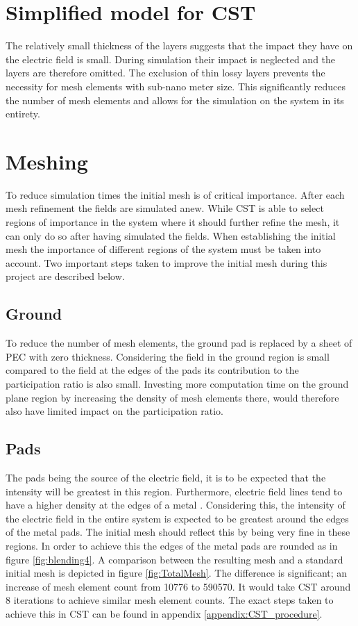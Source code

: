 \section{Simplified model for CST}
The relatively small thickness of the layers suggests that the impact they have on the electric field is small. During simulation their impact is neglected and the layers are therefore omitted. The exclusion of thin lossy layers prevents the necessity for mesh elements with sub-nano meter size. This significantly reduces the number of mesh elements and allows for the simulation on the system in its entirety.

\section{Meshing}
To reduce simulation times the initial mesh is of critical importance. After each mesh refinement the fields are simulated anew. While CST is able to select regions of importance in the system where it should further refine the mesh, it can only do so after having simulated the fields. When establishing the initial mesh the importance of different regions of the system must be taken into account. Two  important steps taken to improve the initial mesh during this project are described below.   


\subsection{Ground}
To reduce the number of mesh elements, the ground pad is replaced by a sheet of PEC with zero thickness. Considering the field in the ground region is small compared to the field at the edges of the pads its contribution to the participation ratio is also small. Investing more computation time on the ground plane region by increasing the density of mesh elements there, would therefore also have limited impact on the participation ratio.
\subsection{Pads}
The pads being the source of the electric field, it is to be expected that the intensity will be greatest in this region. Furthermore, electric field lines tend to have a higher density at the edges of a metal . Considering this, the intensity of the electric field in the entire system is expected to be greatest around the edges of the metal pads. The initial mesh should reflect this by being very fine in these regions. In order to achieve this the edges of the metal pads are rounded as in figure \ref{fig:blending4}. A comparison between the resulting mesh and a standard initial mesh is depicted in figure \ref{fig:TotalMesh}. The difference is significant; an increase of mesh element count from 10776 to 590570. It would take CST around 8 iterations to achieve similar mesh element counts. The exact steps taken to achieve this in CST can be found in appendix \ref{appendix:CST_procedure}. 

